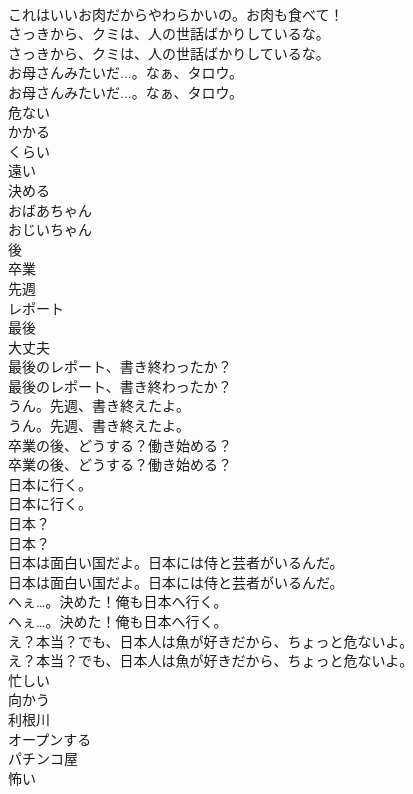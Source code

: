 \documentclass[8pt]{extreport}
\begin{document}
\begin{CJK}{UTF8}{min}
\\	これはいいお肉だからやわらかいの。お肉も食べて！ 
\\	さっきから、クミは、人の世話ばかりしているな。	
\\	さっきから、クミは、人の世話ばかりしているな。 
\\	お母さんみたいだ...。なぁ、タロウ。	
\\	お母さんみたいだ...。なぁ、タロウ。 
\\	危ない
\\	かかる
\\	くらい
\\	遠い
\\	決める
\\	おばあちゃん
\\	おじいちゃん
\\	後
\\	卒業
\\	先週
\\	レポート
\\	最後
\\	大丈夫
\\	最後のレポート、書き終わったか？	
\\	最後のレポート、書き終わったか？ 
\\	うん。先週、書き終えたよ。	
\\	うん。先週、書き終えたよ。 
\\	卒業の後、どうする？働き始める？	
\\	卒業の後、どうする？働き始める？ 
\\	日本に行く。	
\\	日本に行く。 
\\	日本？	
\\	日本？ 
\\	日本は面白い国だよ。日本には侍と芸者がいるんだ。	
\\	日本は面白い国だよ。日本には侍と芸者がいるんだ。 
\\	へぇ…。決めた！俺も日本へ行く。	
\\	へぇ…。決めた！俺も日本へ行く。 
\\	え？本当？でも、日本人は魚が好きだから、ちょっと危ないよ。	
\\	え？本当？でも、日本人は魚が好きだから、ちょっと危ないよ。 
\\	忙しい
\\	向かう
\\	利根川
\\	オープンする
\\	パチンコ屋
\\	怖い

\end{CJK}
\end{document}
